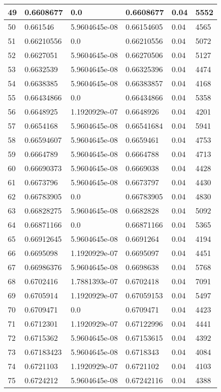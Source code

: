 \begin{longtable}{|l|l|l|l|l|l|}
49 & 0.6608677 & 0.0 & 0.6608677 & 0.04 & 5552 \\ \hline 
50 & 0.661546 & 5.9604645e-08 & 0.66154605 & 0.04 & 4565 \\ \hline 
51 & 0.66210556 & 0.0 & 0.66210556 & 0.04 & 5072 \\ \hline 
52 & 0.6627051 & 5.9604645e-08 & 0.66270506 & 0.04 & 5127 \\ \hline 
53 & 0.6632539 & 5.9604645e-08 & 0.66325396 & 0.04 & 4474 \\ \hline 
54 & 0.6638385 & 5.9604645e-08 & 0.66383857 & 0.04 & 4168 \\ \hline 
55 & 0.66434866 & 0.0 & 0.66434866 & 0.04 & 5358 \\ \hline 
56 & 0.6648925 & 1.1920929e-07 & 0.6648926 & 0.04 & 4201 \\ \hline 
57 & 0.6654168 & 5.9604645e-08 & 0.66541684 & 0.04 & 5941 \\ \hline 
58 & 0.66594607 & 5.9604645e-08 & 0.6659461 & 0.04 & 4753 \\ \hline 
59 & 0.6664789 & 5.9604645e-08 & 0.6664788 & 0.04 & 4713 \\ \hline 
60 & 0.66690373 & 5.9604645e-08 & 0.6669038 & 0.04 & 4428 \\ \hline 
61 & 0.6673796 & 5.9604645e-08 & 0.6673797 & 0.04 & 4430 \\ \hline 
62 & 0.66783905 & 0.0 & 0.66783905 & 0.04 & 4830 \\ \hline 
63 & 0.66828275 & 5.9604645e-08 & 0.6682828 & 0.04 & 5092 \\ \hline 
64 & 0.66871166 & 0.0 & 0.66871166 & 0.04 & 5365 \\ \hline 
65 & 0.66912645 & 5.9604645e-08 & 0.6691264 & 0.04 & 4194 \\ \hline 
66 & 0.6695098 & 1.1920929e-07 & 0.6695097 & 0.04 & 4451 \\ \hline 
67 & 0.66986376 & 5.9604645e-08 & 0.6698638 & 0.04 & 5768 \\ \hline 
68 & 0.6702416 & 1.7881393e-07 & 0.6702418 & 0.04 & 7091 \\ \hline 
69 & 0.6705914 & 1.1920929e-07 & 0.67059153 & 0.04 & 5497 \\ \hline 
70 & 0.6709471 & 0.0 & 0.6709471 & 0.04 & 4423 \\ \hline 
71 & 0.6712301 & 1.1920929e-07 & 0.67122996 & 0.04 & 4441 \\ \hline 
72 & 0.6715362 & 5.9604645e-08 & 0.67153615 & 0.04 & 4392 \\ \hline 
73 & 0.67183423 & 5.9604645e-08 & 0.6718343 & 0.04 & 4084 \\ \hline 
74 & 0.6721103 & 1.1920929e-07 & 0.6721102 & 0.04 & 4103 \\ \hline 
75 & 0.6724212 & 5.9604645e-08 & 0.67242116 & 0.04 & 4388 \\ \hline 
\end{longtable}